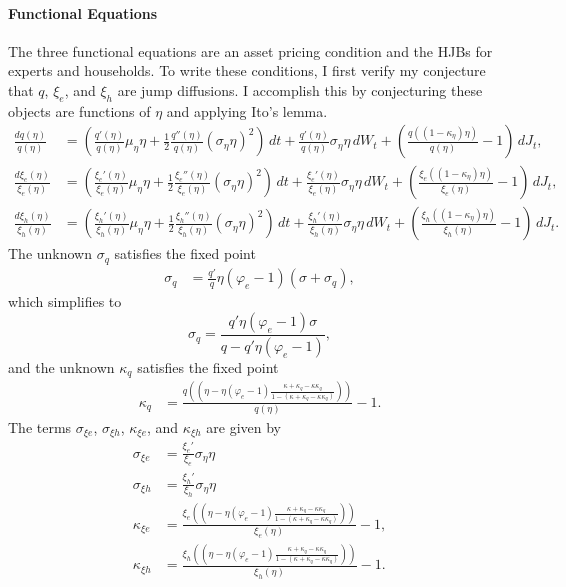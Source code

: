 \documentclass[12 pt, oneside]{article}
\theoremstyle{definition}
\theoremstyle{definition}
\theoremstyle{definition}
\begin{document}
\paragraph{Functional Equations}
The three functional equations are an asset pricing condition and the HJBs for experts and households. To write these conditions, I first verify my conjecture that $q$, $\xi_e$, and $\xi_h$ are jump diffusions. I accomplish this by conjecturing these objects are functions of $\eta$ and applying Ito's lemma.
\begin{align*}
  \frac{dq(\eta)}{q(\eta)} & = \left(\frac{q'(\eta)}{q(\eta)}\mu_\eta\eta + \frac{1}{2}\frac{q''(\eta)}{q(\eta)}(\sigma_\eta\eta)^2 \right)\, dt +\frac{ q'(\eta)}{q(\eta)}\sigma_\eta\eta\, dW_t + \left(\frac{q((1 - \kappa_\eta)\eta)}{q(\eta)} - 1\right)\, dJ_t,\\
  \frac{d\xi_e(\eta)}{\xi_e(\eta)} & = \left(\frac{\xi_e'(\eta)}{\xi_e(\eta)}\mu_\eta\eta + \frac{1}{2}\frac{\xi_e''(\eta)}{\xi_e(\eta)}(\sigma_\eta\eta)^2 \right)\, dt +\frac{ \xi_e'(\eta)}{\xi_e(\eta)}\sigma_\eta\eta\, dW_t + \left(\frac{\xi_e((1 - \kappa_\eta)\eta)}{\xi_e(\eta)} - 1\right)\, dJ_t,\\
  \frac{d\xi_h(\eta)}{\xi_h(\eta)} & = \left(\frac{\xi_h'(\eta)}{\xi_h(\eta)}\mu_\eta\eta + \frac{1}{2}\frac{\xi_h''(\eta)}{\xi_h(\eta)}(\sigma_\eta\eta)^2 \right)\, dt +\frac{ \xi_h'(\eta)}{\xi_h(\eta)}\sigma_\eta\eta\, dW_t + \left(\frac{\xi_h((1 - \kappa_\eta)\eta)}{\xi_h(\eta)} - 1\right)\, dJ_t.
\end{align*}
The unknown $\sigma_q$ satisfies the fixed point
\begin{align*}
\sigma_q & = \frac{q'}{q} \eta(\varphi_e - 1)(\sigma + \sigma_q),
\end{align*}
which simplifies to
\begin{equation}\label{eq:sigma q closed form}
  \sigma_q = \frac{q'\eta(\varphi_e - 1)\sigma}{q - q'\eta(\varphi_e - 1)},
\end{equation}
and the unknown $\kappa_q$ satisfies the fixed point
\begin{align}\label{eq:kappa q fixed point}
  \kappa_q & = \frac{q\left(\left(\eta - \eta(\varphi_e - 1)\frac{\kappa + \kappa_q - \kappa\kappa_q}{1 - (\kappa + \kappa_q - \kappa\kappa_q)}\right)\right)}{q(\eta)} - 1.
\end{align}
The terms $\sigma_{\xi e}$, $\sigma_{\xi h}$, $\kappa_{\xi e}$, and $\kappa_{\xi h}$ are given by
\begin{align}
\label{eq:sigma xi e closed form}
  \sigma_{\xi e} & = \frac{\xi_e'}{\xi_e}\sigma_\eta\eta\\
\label{eq:sigma xi h closed form}
  \sigma_{\xi h} & = \frac{\xi_h'}{\xi_h}\sigma_\eta\eta\\
\label{eq:kappa xi e closed form}
  \kappa_{\xi e} & = \frac{\xi_e\left(\left(\eta - \eta(\varphi_e - 1)\frac{\kappa + \kappa_{q} - \kappa\kappa_{q}}{1 - (\kappa + \kappa_{q} - \kappa\kappa_{q})}\right)\right)}{\xi_e(\eta)} - 1,\\
\label{eq:kappa xi h closed form}
  \kappa_{\xi h} & = \frac{\xi_h\left(\left(\eta - \eta(\varphi_e - 1)\frac{\kappa + \kappa_{q} - \kappa\kappa_{q}}{1 - (\kappa + \kappa_{q} - \kappa\kappa_{q})}\right)\right)}{\xi_h(\eta)} - 1.
\end{align}
\end{document}
